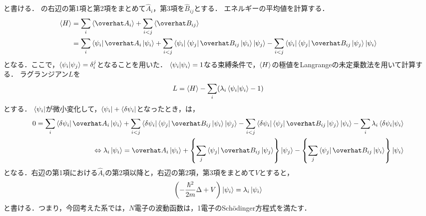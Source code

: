 \documentclass{report}
\begin{document}
      と書ける．
      の右辺の第1項と第2項をまとめて$\hat{A}_i$，第3項を$\hat{B}_{ij}$とする．
      エネルギーの平均値を計算する．
      \begin{align}
        \ev{H} &= \sum_{i}\ev{\hat{A}_i} + \sum_{i < j}\ev{\hat{B}_{ij}} \\
        &= \sum_{i}\bra{\psi_i}\hat{A}_i\ket{\psi_i} 
        + \sum_{i < j}\bra{\psi_i}\bra{\psi_j}\hat{B}_{ij}\ket{\psi_i}\ket{\psi_j} - \sum_{i < j}\bra{\psi_i}\bra{\psi_j}\hat{B}_{ij}\ket{\psi_j}\ket{\psi_i} \label{energy-expectation}
      \end{align}
      となる．ここで，$\braket{\psi_i}{\psi_j} = \delta^j_i$となることを用いた．
      $\braket{\psi_i}{\psi_i} = 1$なる束縛条件で，$\ev{H}$の極値をLangrangeの未定乗数法を用いて計算する．
      ラグランジアン$L$を
      \begin{align}
        L = \ev{H} - \sum_i(\lambda_i\braket{\psi_i}{\psi_i} - 1)\label{lagrange}
      \end{align}
      とする．
      $\bra{\psi_i}$が微小変化して，$\bra{\psi_i} + \bra{\delta\psi_i}$となったとき，は，
      \begin{align}
        0 = \sum_{i}\bra{\delta\psi_i}\hat{A}_i\ket{\psi_i}
        + \sum_{i < j}\bra{\delta\psi_i}\bra{\psi_j}\hat{B}_{ij}\ket{\psi_i}\ket{\psi_j} - \sum_{i < j}\bra{\delta\psi_i}\bra{\psi_j}\hat{B}_{ij}\ket{\psi_j}\ket{\psi_i} - \sum_{i}\lambda_i\braket{\delta\psi_i}{\psi_i} \\ 
        \Leftrightarrow
        \lambda_i\ket{\psi_i} = \hat{A}_i\ket{\psi_i} + \qty{\sum_{j}\bra{\psi_j}\hat{B}_{ij}\ket{\psi_j}}\ket{\psi_j} - \qty{\sum_{j}\bra{\psi_j}\hat{B}_{ij}\ket{\psi_i}}\ket{\psi_i}
      \end{align}
      となる．右辺の第1項における$\hat{A}_i$の第2項以降と，右辺の第2項，第3項をまとめて$V$とすると，
      \begin{align}
        \qty(-\frac{\hbar^2}{2m}\Delta + V)\ket{\psi_i} = \lambda_i\ket{\psi_i} \label{schrodinger-eq}
      \end{align}
      と書ける．つまり，今回考えた系では，$N$電子の波動函数は，1電子のSch\"odinger方程式を満たす．
\end{document}
